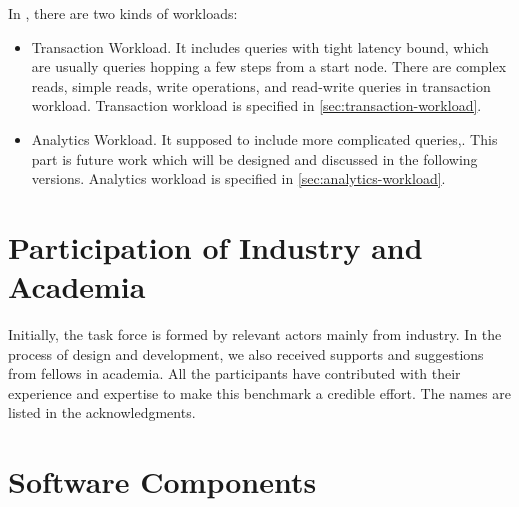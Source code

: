 In \ldbcfinbench, there are two kinds of workloads:
\begin{itemize}
    \item Transaction Workload. It includes queries with tight latency bound, which are usually
          queries hopping a few steps from a start node. There are complex reads, simple reads, write
          operations, and read-write queries in transaction workload. Transaction workload is specified
          in \autoref{sec:transaction-workload}.
    \item Analytics Workload. It supposed to include more complicated queries,. This part is future work which will be designed and discussed in the
          following versions. Analytics workload is specified in \autoref{sec:analytics-workload}.
\end{itemize}


\section{Participation of Industry and Academia}

Initially, the \ldbcfinbench task force is formed by relevant actors mainly from
industry. In the process of design and development, we also received supports and
suggestions from fellows in academia. All the participants have contributed with
their experience and expertise to make this benchmark a credible effort. The names
are listed in the acknowledgments.


\section{Software Components}

